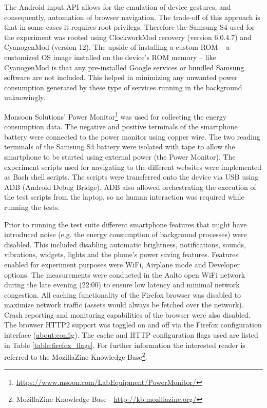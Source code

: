 \documentclass{article}
\begin{document}
The Android input API allows for the emulation of device gestures, and consequently, automation of browser navigation. The trade-off of this approach is that in some cases it requires root privilegs. Therefore the Samsung S4 used for the experiment was rooted using ClockworkMod recovery (version 6.0.4.7) and CyanogenMod (version 12). The upside of installing a custom ROM -- a customized OS image installed on the device's ROM memory -- like CyanogenMod is that any pre-installed Google services or bundled Samsung software are not included. This helped in minimizing any unwanted power consumption generated by these type of services running in the background unknowingly.

Monsoon Solutions' Power Monitor\footnote{\url{https://www.msoon.com/LabEquipment/PowerMonitor/}} was used for collecting the energy consumption data. The negative and positive terminals of the smartphone battery were connected to the power monitor using copper wire. The two reading terminals of the Samsung S4 battery were isolated with tape to allow the smartphone to be started using external power (the Power Monitor). The experiment scripts used for navigating to the different websites were implemented as Bash shell scripts. The scripts were transferred onto the device via USB using ADB (Android Debug Bridge). ADB also allowed orchestrating the execution of the test scripts from the laptop, so no human interaction was required while running the tests.

Prior to running the test suite different smartphone features that might have introduced noise (e.g. the energy consumption of background processes) were disabled. This included disabling automatic brightness, notifications, sounds, vibrations, widgets, lights and the phone's power saving features. Features enabled for experiment purposes were WiFi, Airplane mode and Developer options. The measurements were conducted in the Aalto open WiFi network during the late evening (22:00) to ensure low latency and minimal network congestion. All caching functionality of the Firefox browser was disabled to maximize network traffic (assets would always be fetched over the network). Crash reporting and monitoring capabilities of the browser were also disabled. The browser HTTP2 support was toggled on and off via the Firefox configuration interface (\url{about:config}). The cache and HTTP configuration flags used are listed in Table \ref{table:firefox_flags}. For further information the interested reader is referred to the MozillaZine Knowledge Base\footnote{MozillaZine Knowledge Base - \url{http://kb.mozillazine.org/}}.
\end{document}
